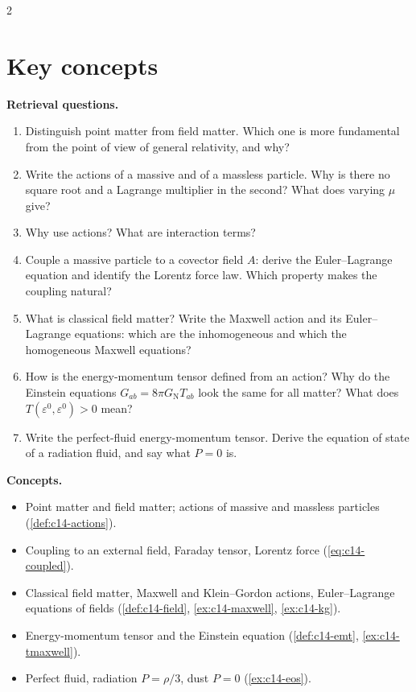 \begin{paracol}{2}
\section*{Key concepts}
\begin{keyconcepts}
\textbf{Retrieval questions.}
\begin{enumerate}
  \item Distinguish point matter from field matter. Which one is more fundamental from the point of view of general relativity, and why?
  \item Write the actions of a massive and of a massless particle. Why is there no square root and a Lagrange multiplier in the second? What does varying $\mu$ give?
  \item Why use actions? What are interaction terms?
  \item Couple a massive particle to a covector field $A$: derive the Euler--Lagrange equation and identify the Lorentz force law. Which property makes the coupling natural?
  \item What is classical field matter? Write the Maxwell action and its Euler--Lagrange equations: which are the inhomogeneous and which the homogeneous Maxwell equations?
  \item How is the energy-momentum tensor defined from an action? Why do the Einstein equations $G_{ab}=8\pi G_{\mathrm N}T_{ab}$ look the same for all matter? What does $T(\varepsilon^0,\varepsilon^0)>0$ mean?
  \item Write the perfect-fluid energy-momentum tensor. Derive the equation of state of a radiation fluid, and say what $P=0$ is.
\end{enumerate}
\textbf{Concepts.}
\begin{itemize}
  \item Point matter and field matter; actions of massive and massless particles (\cref{def:c14-actions}).
  \item Coupling to an external field, Faraday tensor, Lorentz force (\eqref{eq:c14-coupled}).
  \item Classical field matter, Maxwell and Klein--Gordon actions, Euler--Lagrange equations of fields (\cref{def:c14-field}, \cref{ex:c14-maxwell}, \cref{ex:c14-kg}).
  \item Energy-momentum tensor and the Einstein equation (\cref{def:c14-emt}, \cref{ex:c14-tmaxwell}).
  \item Perfect fluid, radiation $P=\rho/3$, dust $P=0$ (\cref{ex:c14-eos}).
\end{itemize}
\end{keyconcepts}

\flushside
\end{paracol}
